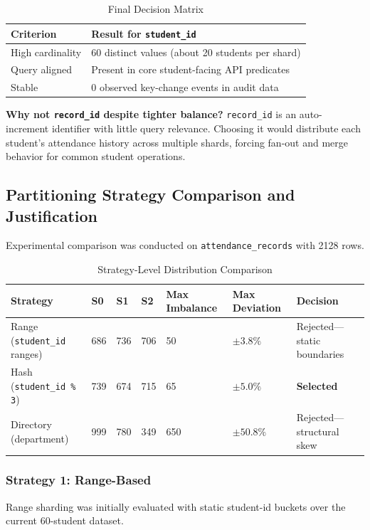 \documentclass[conference]{IEEEtran}
\begin{document}
\begin{table}[htbp]
\caption{Final Decision Matrix}
\centering
\begin{tabular}{p{2.35cm}p{4.1cm}}
\toprule
\textbf{Criterion} & \textbf{Result for \texttt{student\_id}} \\
\midrule
High cardinality & 60 distinct values (about 20 students per shard) \\
Query aligned & Present in core student-facing API predicates \\
Stable & 0 observed key-change events in audit data \\
\bottomrule
\end{tabular}
\label{tab:decision_matrix}
\end{table}

\textbf{Why not \texttt{record\_id} despite tighter balance?}
\texttt{record\_id} is an auto-increment identifier with little query relevance. Choosing it would distribute each student's attendance history across multiple shards, forcing fan-out and merge behavior for common student operations.

\subsection{Partitioning Strategy Comparison and Justification}
Experimental comparison was conducted on \texttt{attendance\_records} with 2128 rows.

\begin{table}[t]
\caption{Strategy-Level Distribution Comparison}
\centering
\footnotesize
\setlength{\tabcolsep}{4pt}
\begin{tabular}{p{3.1cm}p{1.0cm}p{1.0cm}p{1.0cm}p{2.0cm}p{2.0cm}p{2.5cm}}
\toprule
\textbf{Strategy} & \textbf{S0} & \textbf{S1} & \textbf{S2} & \textbf{Max Imbalance} & \textbf{Max Deviation} & \textbf{Decision} \\
\midrule
Range (\texttt{student\_id} ranges) & 686 & 736 & 706 & 50 & $\pm 3.8\%$ & Rejected---static boundaries \\
Hash (\texttt{student\_id \% 3}) & 739 & 674 & 715 & 65 & $\pm 5.0\%$ & \textbf{Selected} \\
Directory (department) & 999 & 780 & 349 & 650 & $\pm 50.8\%$ & Rejected---structural skew \\
\bottomrule
\end{tabular}
\normalsize
\label{tab:strategy_comparison}
\end{table}

\subsubsection{Strategy 1: Range-Based}
Range sharding was initially evaluated with static student-id buckets over the current 60-student dataset.
\end{document}
